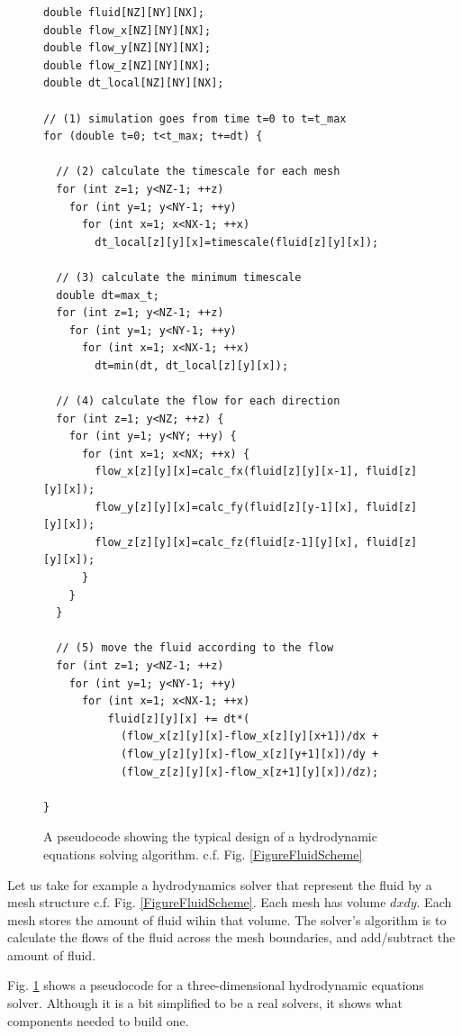 \documentclass[twocolumn]{article}
\begin{document}
\begin{figure}
\begin{verbatim}
double fluid[NZ][NY][NX];
double flow_x[NZ][NY][NX];
double flow_y[NZ][NY][NX];
double flow_z[NZ][NY][NX];
double dt_local[NZ][NY][NX];

// (1) simulation goes from time t=0 to t=t_max
for (double t=0; t<t_max; t+=dt) {

  // (2) calculate the timescale for each mesh
  for (int z=1; y<NZ-1; ++z) 
    for (int y=1; y<NY-1; ++y) 
      for (int x=1; x<NX-1; ++x) 
        dt_local[z][y][x]=timescale(fluid[z][y][x]);

  // (3) calculate the minimum timescale
  double dt=max_t;
  for (int z=1; y<NZ-1; ++z) 
    for (int y=1; y<NY-1; ++y) 
      for (int x=1; x<NX-1; ++x) 
        dt=min(dt, dt_local[z][y][x]);

  // (4) calculate the flow for each direction
  for (int z=1; y<NZ; ++z) {
    for (int y=1; y<NY; ++y) { 
      for (int x=1; x<NX; ++x) { 
        flow_x[z][y][x]=calc_fx(fluid[z][y][x-1], fluid[z][y][x]);
        flow_y[z][y][x]=calc_fy(fluid[z][y-1][x], fluid[z][y][x]);
        flow_z[z][y][x]=calc_fz(fluid[z-1][y][x], fluid[z][y][x]);
      }
    }
  }

  // (5) move the fluid according to the flow
  for (int z=1; y<NZ-1; ++z) 
    for (int y=1; y<NY-1; ++y) 
      for (int x=1; x<NX-1; ++x)
          fluid[z][y][x] += dt*(
            (flow_x[z][y][x]-flow_x[z][y][x+1])/dx +
            (flow_y[z][y][x]-flow_x[z][y+1][x])/dy +
            (flow_z[z][y][x]-flow_x[z+1][y][x])/dz);

}
\end{verbatim}
  \caption{A pseudocode showing the typical design of a hydrodynamic
    equations solving algorithm.  c.f.  Fig. \ref{FigureFluidScheme}
  }\label{FigureHydroPseudoCode}
\end{figure}

Let us take for example a hydrodynamics solver that represent the fluid by a
mesh structure c.f. Fig. \ref{FigureFluidScheme}. Each mesh has volume
$\mathit{dx} \mathit{dy}$. Each mesh stores the amount of fluid wihin that
volume. The solver's algorithm is to calculate the flows of the fluid across the
mesh boundaries, and add/subtract the amount of fluid.

Fig. \ref{FigureHydroPseudoCode} shows a pseudocode for a
three-dimensional hydrodynamic equations solver. Although it is a bit
simplified to be a real solvers, it shows what components needed to
build one.
\end{document}
